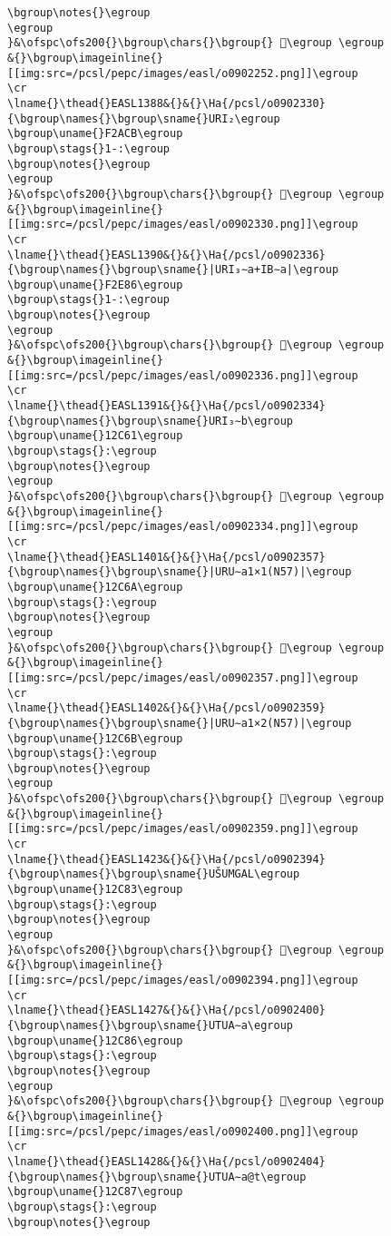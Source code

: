\begin{verbatim}
\bgroup\notes{}\egroup
\egroup
}&\ofspc\ofs200{}\bgroup\chars{}\bgroup{} 𒰬\egroup \egroup
&{}\bgroup\imageinline{}[[img:src=/pcsl/pepc/images/easl/o0902252.png]]\egroup
\cr
\lname{}\thead{}EASL1388&{}&{}\Ha{/pcsl/o0902330}{\bgroup\names{}\bgroup\sname{}URI₂\egroup
\bgroup\uname{}F2ACB\egroup
\bgroup\stags{}1-:\egroup
\bgroup\notes{}\egroup
\egroup
}&\ofspc\ofs200{}\bgroup\chars{}\bgroup{} 󲫋\egroup \egroup
&{}\bgroup\imageinline{}[[img:src=/pcsl/pepc/images/easl/o0902330.png]]\egroup
\cr
\lname{}\thead{}EASL1390&{}&{}\Ha{/pcsl/o0902336}{\bgroup\names{}\bgroup\sname{}|URI₃∼a+IB∼a|\egroup
\bgroup\uname{}F2E86\egroup
\bgroup\stags{}1-:\egroup
\bgroup\notes{}\egroup
\egroup
}&\ofspc\ofs200{}\bgroup\chars{}\bgroup{} 󲺆\egroup \egroup
&{}\bgroup\imageinline{}[[img:src=/pcsl/pepc/images/easl/o0902336.png]]\egroup
\cr
\lname{}\thead{}EASL1391&{}&{}\Ha{/pcsl/o0902334}{\bgroup\names{}\bgroup\sname{}URI₃∼b\egroup
\bgroup\uname{}12C61\egroup
\bgroup\stags{}:\egroup
\bgroup\notes{}\egroup
\egroup
}&\ofspc\ofs200{}\bgroup\chars{}\bgroup{} 𒱡\egroup \egroup
&{}\bgroup\imageinline{}[[img:src=/pcsl/pepc/images/easl/o0902334.png]]\egroup
\cr
\lname{}\thead{}EASL1401&{}&{}\Ha{/pcsl/o0902357}{\bgroup\names{}\bgroup\sname{}|URU∼a1×1(N57)|\egroup
\bgroup\uname{}12C6A\egroup
\bgroup\stags{}:\egroup
\bgroup\notes{}\egroup
\egroup
}&\ofspc\ofs200{}\bgroup\chars{}\bgroup{} 𒱪\egroup \egroup
&{}\bgroup\imageinline{}[[img:src=/pcsl/pepc/images/easl/o0902357.png]]\egroup
\cr
\lname{}\thead{}EASL1402&{}&{}\Ha{/pcsl/o0902359}{\bgroup\names{}\bgroup\sname{}|URU∼a1×2(N57)|\egroup
\bgroup\uname{}12C6B\egroup
\bgroup\stags{}:\egroup
\bgroup\notes{}\egroup
\egroup
}&\ofspc\ofs200{}\bgroup\chars{}\bgroup{} 𒱫\egroup \egroup
&{}\bgroup\imageinline{}[[img:src=/pcsl/pepc/images/easl/o0902359.png]]\egroup
\cr
\lname{}\thead{}EASL1423&{}&{}\Ha{/pcsl/o0902394}{\bgroup\names{}\bgroup\sname{}UŠUMGAL\egroup
\bgroup\uname{}12C83\egroup
\bgroup\stags{}:\egroup
\bgroup\notes{}\egroup
\egroup
}&\ofspc\ofs200{}\bgroup\chars{}\bgroup{} 𒲃\egroup \egroup
&{}\bgroup\imageinline{}[[img:src=/pcsl/pepc/images/easl/o0902394.png]]\egroup
\cr
\lname{}\thead{}EASL1427&{}&{}\Ha{/pcsl/o0902400}{\bgroup\names{}\bgroup\sname{}UTUA∼a\egroup
\bgroup\uname{}12C86\egroup
\bgroup\stags{}:\egroup
\bgroup\notes{}\egroup
\egroup
}&\ofspc\ofs200{}\bgroup\chars{}\bgroup{} 𒲆\egroup \egroup
&{}\bgroup\imageinline{}[[img:src=/pcsl/pepc/images/easl/o0902400.png]]\egroup
\cr
\lname{}\thead{}EASL1428&{}&{}\Ha{/pcsl/o0902404}{\bgroup\names{}\bgroup\sname{}UTUA∼a@t\egroup
\bgroup\uname{}12C87\egroup
\bgroup\stags{}:\egroup
\bgroup\notes{}\egroup

\end{verbatim}
